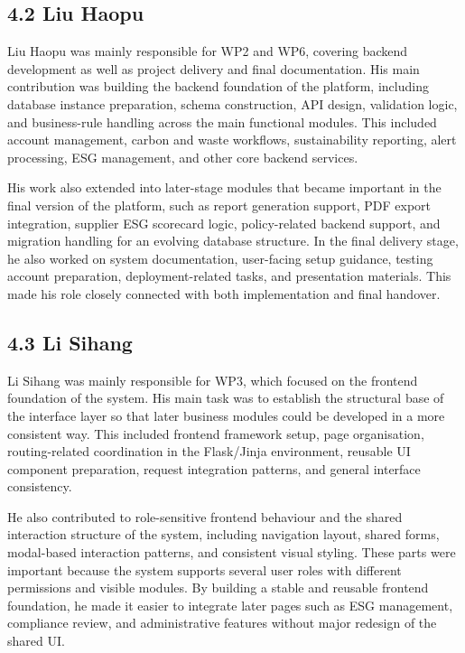 \documentclass[10pt,a4paper]{article}
\begin{document}
\subsection*{4.2 Liu Haopu}
Liu Haopu was mainly responsible for WP2 and WP6, covering backend development as well as project delivery and final documentation. His main contribution was building the backend foundation of the platform, including database instance preparation, schema construction, API design, validation logic, and business-rule handling across the main functional modules. This included account management, carbon and waste workflows, sustainability reporting, alert processing, ESG management, and other core backend services.

His work also extended into later-stage modules that became important in the final version of the platform, such as report generation support, PDF export integration, supplier ESG scorecard logic, policy-related backend support, and migration handling for an evolving database structure. In the final delivery stage, he also worked on system documentation, user-facing setup guidance, testing account preparation, deployment-related tasks, and presentation materials. This made his role closely connected with both implementation and final handover.

\subsection*{4.3 Li Sihang}
Li Sihang was mainly responsible for WP3, which focused on the frontend foundation of the system. His main task was to establish the structural base of the interface layer so that later business modules could be developed in a more consistent way. This included frontend framework setup, page organisation, routing-related coordination in the Flask/Jinja environment, reusable UI component preparation, request integration patterns, and general interface consistency.

He also contributed to role-sensitive frontend behaviour and the shared interaction structure of the system, including navigation layout, shared forms, modal-based interaction patterns, and consistent visual styling. These parts were important because the system supports several user roles with different permissions and visible modules. By building a stable and reusable frontend foundation, he made it easier to integrate later pages such as ESG management, compliance review, and administrative features without major redesign of the shared UI.
\end{document}
